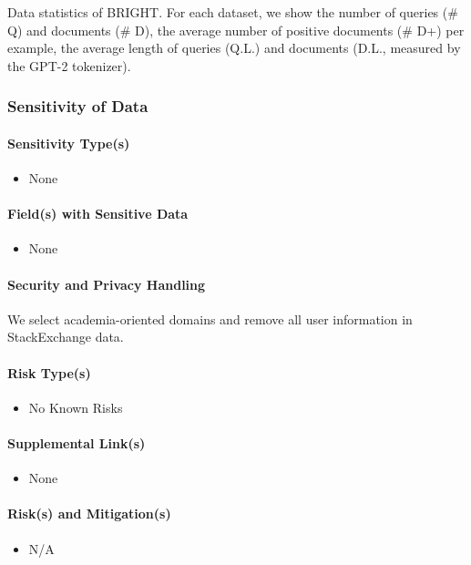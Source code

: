 Data statistics of BRIGHT. For each dataset, we show the number of queries (\# Q) and documents (\# D), the average number of positive documents (\# D+) per example, the average length of queries (Q.L.) and documents (D.L., measured by the GPT-2 tokenizer).

\subsubsection{Sensitivity of Data}

\paragraph{Sensitivity Type(s)}
\begin{itemize}
    \item None
\end{itemize}

\paragraph{Field(s) with Sensitive Data}
\begin{itemize}
    \item None
\end{itemize}

\paragraph{Security and Privacy Handling}
We select academia-oriented domains and remove all user information in StackExchange data.

\paragraph{Risk Type(s)}
\begin{itemize}
    \item No Known Risks
\end{itemize}

\paragraph{Supplemental Link(s)}
\begin{itemize}
    \item None
\end{itemize}

\paragraph{Risk(s) and Mitigation(s)}
\begin{itemize}
    \item N/A
\end{itemize}

